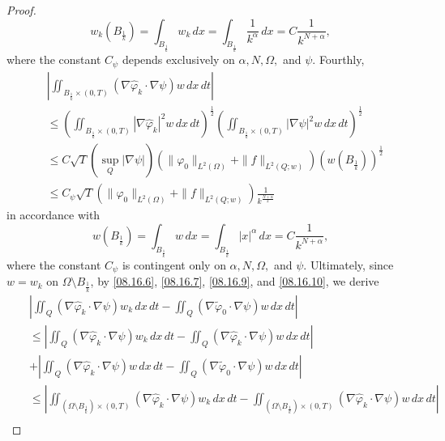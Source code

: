 \documentclass[10pt,a4paper]{amsart}
\begin{document}
\begin{proof}
\begin{equation*}
w_k(B_{\frac{1}{k}}) = \int_{B_{\frac{1}{k}}} w_k \, dx = \int_{B_{\frac{1}{k}}} \frac{1}{k^\alpha} \, dx = C \frac{1}{k^{N+\alpha}},
\end{equation*}
where the constant $C_\psi$ depends exclusively on $\alpha, N, \Omega,$ and $\psi$.
Fourthly,
\begin{equation}\label{08.16.10}
\begin{split}
&\left|\iint_{B_{\frac{1}{k}} \times (0,T)} (\nabla\widehat{\varphi}_k \cdot \nabla\psi) w \, dx \, dt\right| \\
&\leq \left(\iint_{B_{\frac{1}{k}} \times (0,T)} |\nabla\widehat{\varphi}_k|^2 w \, dx \, dt\right)^{\frac{1}{2}} \left(\iint_{B_{\frac{1}{k}} \times (0,T)} |\nabla\psi|^2 w \, dx \, dt\right)^{\frac{1}{2}} \\
&\leq C\sqrt{T} \left(\sup_{Q} |\nabla\psi|\right) \left(\|\varphi_0\|_{L^2(\Omega)} + \|f\|_{L^2(Q; w)}\right) \left(w(B_{\frac{1}{k}})\right)^{\frac{1}{2}} \\
&\leq C_\psi \sqrt{T} \left(\|\varphi_0\|_{L^2(\Omega)} + \|f\|_{L^2(Q; w)}\right) \frac{1}{k^{\frac{N+\alpha}{2}}}
\end{split}
\end{equation}
in accordance with
\begin{equation*}
w(B_{\frac{1}{k}}) = \int_{B_{\frac{1}{k}}} w \, dx = \int_{B_{\frac{1}{k}}} |x|^\alpha \, dx = C \frac{1}{k^{N+\alpha}},
\end{equation*}
where the constant $C_\psi$ is contingent only on $\alpha, N, \Omega,$ and $\psi$.
Ultimately, since $w = w_k$ on $\Omega \setminus B_{\frac{1}{k}}$, by \eqref{08.16.6}, \eqref{08.16.7}, \eqref{08.16.9}, and \eqref{08.16.10}, we derive
\begin{eqnarray*}
&&\left|\iint_Q (\nabla\widehat{\varphi}_k \cdot \nabla\psi) w_k \, dx \, dt - \iint_Q (\nabla\widetilde{\varphi}_0 \cdot \nabla\psi) w \, dx \, dt\right| \\
&&\leq \left|\iint_Q (\nabla\widehat{\varphi}_k \cdot \nabla\psi) w_k \, dx \, dt - \iint_Q (\nabla\widehat{\varphi}_k \cdot \nabla\psi) w \, dx \, dt\right| \\
&&  + \left|\iint_Q (\nabla\widehat{\varphi}_k \cdot \nabla\psi) w \, dx \, dt - \iint_Q (\nabla\widetilde{\varphi}_0 \cdot \nabla\psi) w \, dx \, dt\right| \\
&&\leq \left|\iint_{(\Omega \setminus B_{\frac{1}{k}}) \times (0,T)} (\nabla\widehat{\varphi}_k \cdot \nabla\psi) w_k \, dx \, dt - \iint_{(\Omega \setminus B_{\frac{1}{k}}) \times (0,T)} (\nabla\widehat{\varphi}_k \cdot \nabla\psi) w \, dx \, dt\right| \\

\end{eqnarray*}
\end{proof}
\end{document}
